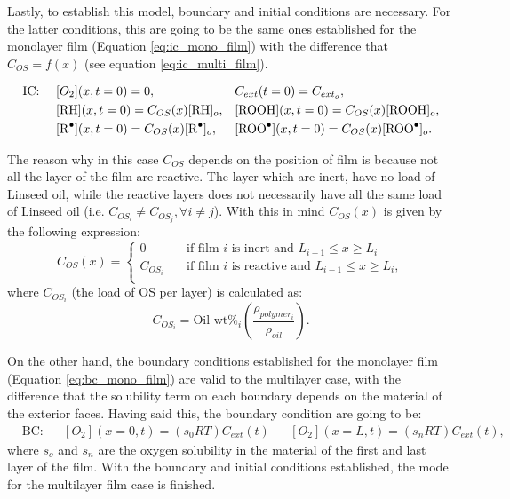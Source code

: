 \begin{refsection}
Lastly, to establish this model, boundary and initial conditions are necessary. For the latter conditions,  this are going to be the same ones established for the monolayer film (Equation  \ref{eq:ic_mono_film}) with the difference that $C_{OS}=f(x)$ (see equation \ref{eq:ic_multi_film}).

\begin{align}
    &\text{IC: } & &[O_2](x,t=0)=0, & &C_{ext}(t=0)= C_{ext_o},\nonumber\\
    && &[\ce{RH}](x,t=0)=C_{OS}(x)[\ce{RH}]_o,   & &[\ce{ROOH}](x,t=0)=C_{OS}(x)[\ce{ROOH}]_o, \nonumber\\
    && &[\ce{R^.}](x,t=0)=C_{OS}(x)[\ce{R^.}]_o,   & &[\ce{ROO^.}](x,t=0)=C_{OS}(x)[\ce{ROO^.}]_o. 
    \label{eq:ic_multi_film}
\end{align}

The reason why in this case $C_{OS}$ depends on the position of film is because not all the layer of the film are reactive. The layer which are inert, have no load of Linseed oil, while the reactive layers does not necessarily have all the same load of Linseed oil (i.e. $C_{OS_i}\neq C_{OS_{j}}, \forall i\neq j$). With this in mind $C_{OS}(x)$  is given by the following expression:
\begin{equation}
    C_{OS}(x)= 
    \begin{cases}
    0  &\quad\text{if film }i \text{ is inert and } L_{i-1} \le x \ge L_i\\
    C_{OS_i}  &\quad\text{if film }i \text{ is reactive and }  L_{i-1} \le x \ge L_i,\\
    \end{cases}
\end{equation}
where $C_{OS_i}$ (the load of OS per layer) is calculated as:
\begin{equation}
    C_{OS_i}= \text{Oil wt}\%_i \left( \frac{\rho_{polymer_i}}{\rho_{oil}}\right).
    \label{eq:load_multi_concentration}
\end{equation}

On the other hand, the boundary conditions established for the monolayer film (Equation \ref{eq:bc_mono_film}) are valid to the multilayer case, with the difference that the solubility term on each boundary depends on the material of the exterior faces. Having said this, the boundary condition are going to be:
\begin{align}
    &\text{BC:} & &[O_2](x=0, t)= \left(s_0RT\right) C_{ext}(t) & & [O_2](x=L, t)= \left(s_nRT\right) C_{ext}(t),
    \label{eq:bc_multi_film}
\end{align}
where $s_o$ and $s_n$ are the oxygen solubility in the material of the first and last layer of the film. With the boundary and initial conditions established, the model for the multilayer film case is finished. 


\end{refsection}
